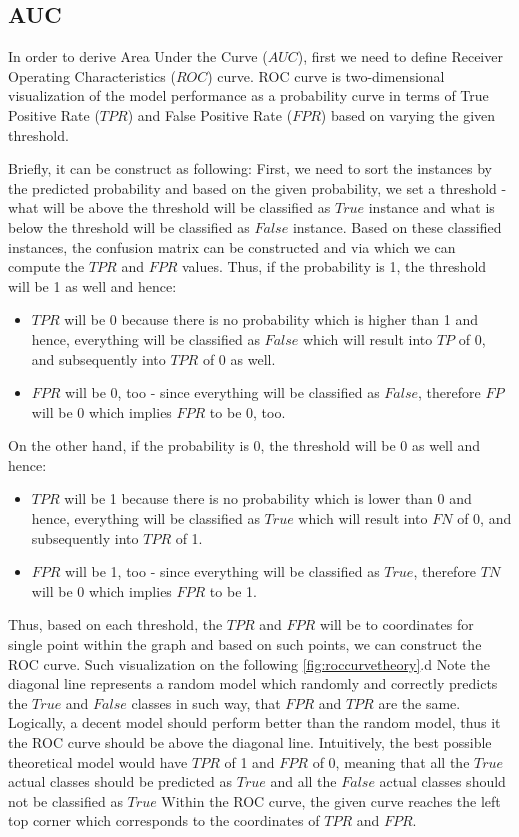 \subsection{AUC}

In order to derive Area Under the Curve ($AUC$), first we need to define Receiver Operating Characteristics ($ROC$) curve.
ROC curve is two-dimensional visualization of the model performance as a probability curve in terms of True Positive Rate ($TPR$) and False Positive Rate ($FPR$) based on varying the given threshold.

Briefly, it can be construct as following: First, we need to sort the instances by the predicted probability and based on the given probability, we set a threshold - what will be above the threshold will be classified as $True$ instance and what is below the threshold will be classified as $False$ instance.
Based on these classified instances, the confusion matrix can be constructed and via which we can compute the $TPR$ and $FPR$ values.
Thus, if the probability is 1, the threshold will be 1 as well and hence:
\begin{itemize}\setlength\itemsep{0em}
    \item $TPR$ will be 0 because there is no probability which is higher than 1 and hence, everything will be classified as $False$ which will result into $TP$ of 0, and subsequently into $TPR$ of 0 as well.
	\item $FPR$ will be 0, too - since everything will be classified as $False$, therefore $FP$ will be 0 which implies $FPR$ to be 0, too.
\end{itemize}
On the other hand, if the probability is 0, the threshold will be 0 as well and hence:
\begin{itemize}\setlength\itemsep{0em}
    \item $TPR$ will be 1 because there is no probability which is lower than 0 and hence, everything will be classified as $True$ which will result into $FN$ of 0, and subsequently into $TPR$ of 1.
	\item $FPR$ will be 1, too - since everything will be classified as $True$, therefore $TN$ will be 0 which implies $FPR$ to be 1.
\end{itemize}

Thus, based on each threshold, the $TPR$ and $FPR$ will be to coordinates for single point within the graph and based on such points, we can construct the ROC curve.
Such visualization on the following \autoref{fig:roccurvetheory}.d
Note the diagonal line represents a random model which randomly and correctly predicts the $True$ and $False$ classes in such way, that $FPR$ and $TPR$ are the same.
Logically, a decent model should perform better than the random model, thus it the ROC curve should be above the diagonal line.
Intuitively, the best possible theoretical model would have $TPR$ of 1 and $FPR$ of 0, meaning that all the $True$ actual classes should be predicted as $True$ and all the $False$ actual classes should not be classified as $True$
 Within the ROC curve, the given curve reaches the left top corner which corresponds to the coordinates of $TPR$ and $FPR$.

